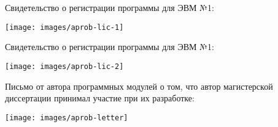 
Свидетельство о регистрации программы для ЭВМ №1:

\begin{minipage}[h]{\linewidth}
	\texttt{[image: images/aprob-lic-1]}
\end{minipage}

\newpage
Свидетельство о регистрации программы для ЭВМ №1:

\begin{minipage}[h]{\linewidth}
	\texttt{[image: images/aprob-lic-2]}
\end{minipage}

\newpage
Письмо от автора программных модулей о том, что автор магистерской диссертации принимал участие при их разработке:

\begin{minipage}[h]{\linewidth}
	\texttt{[image: images/aprob-letter]}
\end{minipage}

